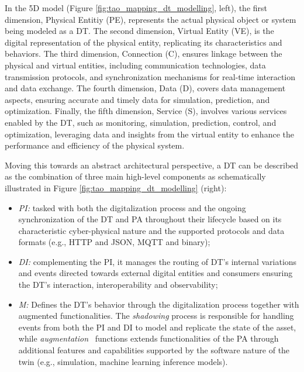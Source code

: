 In the 5D model (Figure \ref{fig:tao_mapping_dt_modelling}, left), 
the first dimension, Physical Entitiy (PE), represents the actual physical object or system being modeled as a \ac{DT}.
The second dimension, Virtual Entity (VE), is the digital representation of the physical entity, replicating its characteristics and behaviors.
The third dimension, Connection (C), ensures linkage between the physical and virtual entities, including communication technologies, data transmission protocols, and synchronization mechanisms for real-time interaction and data exchange.
The fourth dimension, Data (D), covers data management aspects, ensuring accurate and timely data for simulation, prediction, and optimization.
Finally, the fifth dimension, Service (S), involves various services enabled by the \ac{DT}, such as monitoring, simulation, prediction, control, and optimization, leveraging data and insights from the virtual entity to enhance the performance and efficiency of the physical system.

Moving this towards an abstract architectural perspective, a \ac{DT} can be described as the combination of three main high-level components as schematically illustrated in Figure \ref{fig:tao_mapping_dt_modelling} (right): 

\begin{itemize}
    \item \textit{\ac{PI}:} tasked with both the digitalization process and the ongoing synchronization of the \ac{DT} and \ac{PA} throughout their lifecycle based on its characteristic cyber-physical nature and the supported protocols and data formats (e.g., HTTP and JSON, MQTT and binary);
    \item \textit{\ac{DI}:} complementing the \ac{PI}, it manages the routing of \ac{DT}'s internal variations and events directed towards external digital entities and consumers ensuring the \ac{DT}'s interaction, interoperability and observability;
    \item  \textit{\ac{M}:} Defines the \ac{DT}'s behavior through the digitalization process together with augmented functionalities.
    The \textit{shadowing} process is responsible for handling events from both the \ac{PI} and \ac{DI} to model and replicate the state of the asset,
    while \textit{augmentation}~\cite{dt-IoT-context-Minerva-2020} functions extends functionalities of the \ac{PA} through additional features and capabilities supported by the software nature of the twin (e.g., simulation, machine learning inference models).
\end{itemize}


